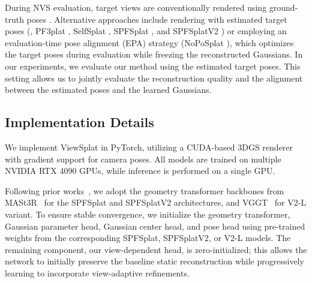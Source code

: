 \documentclass[runningheads]{llncs}
\begin{document}
During NVS evaluation, target views are conventionally rendered using gro\-und-truth poses \cite{charatan2024pixelsplat,chen2024mvsplat,hong2024coponerf,smart2024splatt3r}. Alternative approaches include rendering with estimated target poses (\eg, PF3plat \cite{hong2025pf3plat}, SelfSplat \cite{kang2025selfsplat}, SPFSplat \cite{huang2025spfsplat}, and SPFSplatV2 \cite{huang2025spfsplatv2}) or employing an evaluation-time pose alignment (EPA) strategy (NoPoSplat \cite{ye2025noposplat}), which optimizes the target poses during evaluation while freezing the reconstructed Gaussians. In our experiments, we evaluate our method using the estimated target poses. This setting allows us to jointly evaluate the reconstruction quality and the alignment between the estimated poses and the learned Gaussians.

\vspace{-0.3cm}
\subsection{Implementation Details}
\vspace{-0.1cm}
We implement ViewSplat in PyTorch, utilizing a CUDA-based 3DGS renderer with gradient support for camera poses. All models are trained on multiple NVIDIA RTX 4090 GPUs, while inference is performed on a single GPU.

Following prior works~\cite{huang2025spfsplat,huang2025spfsplatv2}, we adopt the geometry transformer backbones from MASt3R~\cite{leroy2024mast3r} for the SPFSplat and SPFSplatV2 architectures, and VGGT~\cite{wang2025vggt} for V2-L variant.
To ensure stable convergence, we initialize the geometry transformer, Gaussian parameter head, Gaussian center head, and pose head using pre-trained weights from the corresponding SPFSplat, SPFSplatV2, or V2-L models.
The remaining component, our view-dependent head, is zero-initialized; this allows the network to initially preserve the baseline static reconstruction while progressively learning to incorporate view-adaptive refinements.
\end{document}
